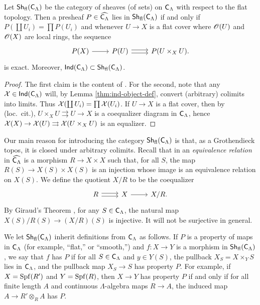 \begin{lemma}
Let $\operatorname{\mathsf{Sh}}_{\mathrm{fl}}(\mathsf{C}_\Lambda)$ be the category of sheaves (of sets) on 
$\mathsf{C}_\Lambda$ with respect to the flat topology. Then a presheaf 
$P\in \widehat{\mathsf{C}_\Lambda}$ lies in $\operatorname{\mathsf{Sh}}_{\mathrm{fl}}(\mathsf{C}_\Lambda)$ if 
and only if $P(\coprod U_i) = \prod P(U_i)$ and whenever 
$U \to X$ is a flat cover where $\mathscr{O}(U)$ and $\mathscr{O}(X)$ are local rings, the 
sequence 
\[
\begin{tikzcd}
	P(X) \ar[r]
		& P(U) \ar[r, shift left=.5ex] \ar[r, shift right=.5ex]
		& P(U\times_X U) .
\end{tikzcd}
\]
is exact. Moreover, 
$\operatorname{\mathsf{Ind}}(\mathsf{C}_\Lambda)\subset \operatorname{\mathsf{Sh}}_{\mathrm{fl}}(\mathsf{C}_\Lambda)$. 
\end{lemma}
\begin{proof}
The first claim is the content of \cite[IV 6.3.1(ii)]{sga3-1}. For the second, 
note that any $\mathcal{X}\in \operatorname{\mathsf{Ind}}(\mathsf{C}_\Lambda)$ will, by Lemma 
\ref{thm:ind-object-def}, convert (arbitrary) colimits into limits. Thus 
$\mathcal{X}(\coprod U_i) = \prod \mathcal{X}(U_i)$. If $U\to X$ is a flat cover, then by (loc.~cit.), $U\times_X U\rightrightarrows U\to X$ is a coequalizer diagram in 
$\mathsf{C}_\Lambda$, hence 
$\mathcal{X}(X)\to \mathcal{X}(U)\rightrightarrows \mathcal{X}(U\times_X U)$ is an equalizer. 
\end{proof}

Our main reason for introducing the category $\operatorname{\mathsf{Sh}}_{\mathrm{fl}}(\mathsf{C}_\Lambda)$ 
is that, as a Grothendieck topos, it is closed under arbitrary colimits. 
Recall that in an \emph{equivalence relation} in $\widehat{\mathsf{C}_\Lambda}$ 
is a morphism $R\to X\times X$ such that, for all $S$, the map 
$R(S)\to X(S)\times X(S)$ is an injection whose image is an equivalence 
relation on $X(S)$. We define the quotient $X/R$ to be the coequalizer 
\[
\begin{tikzcd}
	R \ar[r, shift left=.5ex] \ar[r, shift right=.5ex]
		& X \ar[r]
		& X/R .
\end{tikzcd}
\]
By Giraud's Theorem \cite[App.]{maclane-moerdijk-1994}, for any 
$S\in \mathsf{C}_\Lambda$, the natural map $X(S)/R(S)\to (X/R)(S)$ is injective. 
It will not be surjective in general. 

We let $\operatorname{\mathsf{Sh}}_{\mathrm{fl}}(\mathsf{C}_\Lambda)$ inherit definitions from 
$\mathsf{C}_\Lambda$ as follows. If $P$ is a property of maps in 
$\mathsf{C}_\Lambda$ (for example, ``flat,'' or ``smooth,'') and 
$f\colon X\to Y$ is a morphism in $\operatorname{\mathsf{Sh}}_{\mathrm{fl}}(\mathsf{C}_\Lambda)$, we say 
that $f$ has $P$ if for all $S\in \mathsf{C}_\Lambda$ and $y\in Y(S)$, the 
pullback $X_S=X\times_Y S$ lies in $\mathsf{C}_\Lambda$, and the pullback map 
$X_S\to S$ has property $P$. For example, if $X=\operatorname{Spf}(R')$ and $Y=\operatorname{Spf}(R)$, then 
$X\to Y$ has property $P$ if and only if for all finite length $A$ and 
continuous $\Lambda$-algebra maps $R\to A$, the induced map 
$A\to R'\otimes_R A$ has $P$.

